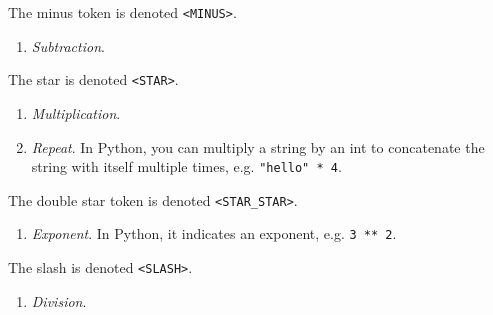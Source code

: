   \begin{example}[Minus]
    \label{ex:minus}
    The minus token is denoted \texttt{<MINUS>}. 
    \begin{enumerate}
      \item \textit{Subtraction}. 
    \end{enumerate}
  \end{example}
 
  \begin{example}[Star]
    \label{ex:star}
    The star is denoted \texttt{<STAR>}. 
    \begin{enumerate}
      \item \textit{Multiplication}. 
      \item \textit{Repeat}. In Python, you can multiply a string by an int to concatenate the string with itself multiple times, e.g. \texttt{"hello" * 4}. 
    \end{enumerate}
  \end{example}

  \begin{example}
    \label{ex:star-star}
    The double star token is denoted \texttt{<STAR\_STAR>}. 
    \begin{enumerate}
      \item \textit{Exponent}. In Python, it indicates an exponent, e.g. \texttt{3 ** 2}. 
    \end{enumerate}
  \end{example}

  \begin{example}[Slash]
    \label{ex:slash}
    The slash is denoted \texttt{<SLASH>}. 
    \begin{enumerate}
      \item \textit{Division}. 
    \end{enumerate}
  \end{example}

